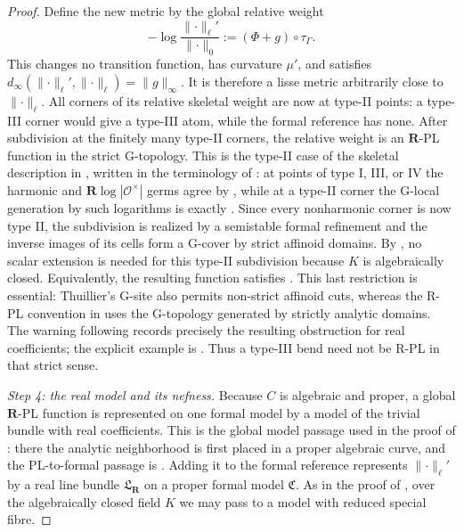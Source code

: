 \begin{proof}
Define the new metric by the global relative weight
\[
 -\log\frac{\lVert\cdot\rVert_{\ell}'}
                 {\lVert\cdot\rVert_0}
       :=(\Phi+g)\circ\tau_\Gamma.
\]
This changes no transition function, has curvature \(\mu'\), and satisfies
\(d_\infty(\lVert\cdot\rVert_{\ell}',
\lVert\cdot\rVert_\ell)=\lVert g\rVert_\infty\). It is therefore a lisse
metric arbitrarily close to \(\lVert\cdot\rVert_\ell\). All corners of its relative
skeletal weight are now at type-II points: a type-III corner would give a
type-III atom, while the formal reference has none. After subdivision at
the finitely many type-II corners, the relative weight is an
\(\mathbf R\)-PL function in the strict G-topology. This is the type-II
case of the skeletal description in
\cite[Props.~3.2.4--3.2.5]{Thu05}, written in the terminology of
\cite[\S2.5]{GR25PL}: at points of type I, III, or IV the harmonic and
\(\mathbf R\log|\mathcal O^\times|\) germs agree by
\cite[Thm.~2.3.21]{Thu05}, while at a type-II corner the G-local
generation by such logarithms is exactly
\cite[Prop.~3.2.5]{Thu05}. Since every nonharmonic corner is now type II,
the subdivision is realized by a semistable formal refinement and the
inverse images of its cells form a G-cover by strict affinoid domains. By
\cite[Lem.~2.2.22(i)]{Thu05}, no scalar extension is needed for this
type-II subdivision because \(K\) is algebraically closed.
Equivalently, the resulting function satisfies
\cite[Def.~5.1 and Cor.~5.9]{GJR26}.
This last restriction is essential: Thuillier's G-site also permits
non-strict affinoid cuts, whereas the R-PL convention in
\cite[\S2.5]{GR25PL} uses the G-topology generated by strictly analytic
domains. The warning following \cite[Cor.~5.5]{GR25PL} records precisely
the resulting obstruction for real coefficients; the explicit example is
\cite[Ex.~5.3]{GJR26}. Thus a type-III bend need not be R-PL in that strict
sense.

\emph{Step 4: the real model and its nefness.}
Because \(C\) is algebraic and proper, a global \(\mathbf R\)-PL function
is represented on one formal model by a model of the trivial bundle with
real coefficients. This is the global model passage used in the proof of
\cite[Thm.~5.6]{GR25PL}: there the analytic neighborhood is first placed
in a proper algebraic curve, and the PL-to-formal passage is
\cite[Prop.~2.10]{GM19}. Adding it to
the formal reference represents
\(\lVert\cdot\rVert_{\ell}'\) by a real line bundle
\(\mathfrak L_{\mathbf R}\) on a proper formal model
\(\mathfrak C\). As in the proof of \cite[Prop.~5.1]{GR25PL}, over the
algebraically closed field \(K\) we may pass to a model with reduced special
fibre.


\end{proof}
